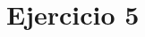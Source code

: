\documentclass[../../labo_tp5_main.tex]{subfiles}
\begin{document}
\section{Ejercicio 5}
\end{document}
